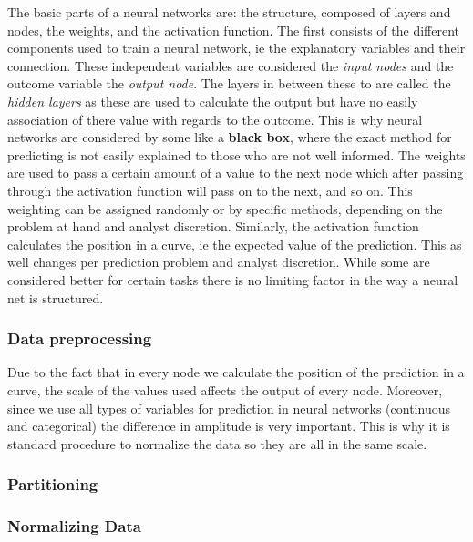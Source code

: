 \documentclass[
  paper=a4,
  ,captions=tableheading
]{scrartcl}
\begin{document}
The basic parts of a neural networks are: the structure, composed of
layers and nodes, the weights, and the activation function. The first
consists of the different components used to train a neural network, ie
the explanatory variables and their connection. These independent
variables are considered the \emph{input nodes} and the outcome variable
the \emph{output node}. The layers in between these to are called the
\emph{hidden layers} as these are used to calculate the output but have
no easily association of there value with regards to the outcome. This
is why neural networks are considered by some like a \textbf{black box},
where the exact method for predicting is not easily explained to those
who are not well informed. The weights are used to pass a certain amount
of a value to the next node which after passing through the activation
function will pass on to the next, and so on. This weighting can be
assigned randomly or by specific methods, depending on the problem at
hand and analyst discretion. Similarly, the activation function
calculates the position in a curve, ie the expected value of the
prediction. This as well changes per prediction problem and analyst
discretion. While some are considered better for certain tasks there is
no limiting factor in the way a neural net is structured.

\hypertarget{data-preprocessing}{%
\subsubsection{Data preprocessing}\label{data-preprocessing}}

Due to the fact that in every node we calculate the position of the
prediction in a curve, the scale of the values used affects the output
of every node. Moreover, since we use all types of variables for
prediction in neural networks (continuous and categorical) the
difference in amplitude is very important. This is why it is standard
procedure to normalize the data so they are all in the same scale.

\hypertarget{partitioning-1}{%
\subsubsection{Partitioning}\label{partitioning-1}}

\hypertarget{normalizing-data}{%
\subsubsection{Normalizing Data}\label{normalizing-data}}
\end{document}
